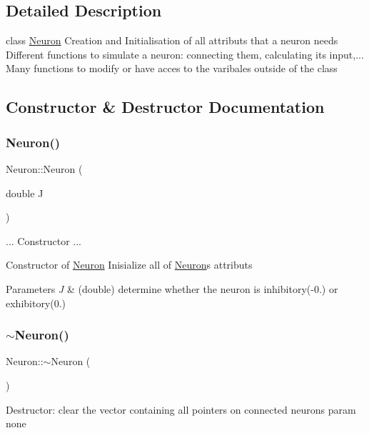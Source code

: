 \subsection{Detailed Description}
class \hyperlink{class_neuron}{Neuron} Creation and Initialisation of all attributs that a neuron needs Different functions to simulate a neuron\+: connecting them, calculating its input,... Many functions to modify or have acces to the varibales outside of the class 

\subsection{Constructor \& Destructor Documentation}
\mbox{\label{class_neuron_abefafe25b0ffd7144510bd26d193fe3b}} 
\subsubsection{\texorpdfstring{Neuron()}{Neuron()}}
{\footnotesize\ttfamily Neuron\+::\+Neuron (\begin{DoxyParamCaption}\item[{double}]{J }\end{DoxyParamCaption})}

... Constructor ...

Constructor of \hyperlink{class_neuron}{Neuron} Inisialize all of \hyperlink{class_neuron}{Neuron}\textquotesingle{}s attributs 
\begin{DoxyParams}{Parameters}
{\em J} & (double) determine whether the neuron is inhibitory(-\/0.) or exhibitory(0.) \\
\hline
\end{DoxyParams}
\mbox{\label{class_neuron_a94a250ce7e167760e593979b899745b1}} 
\subsubsection{\texorpdfstring{$\sim$\+Neuron()}{~Neuron()}}
{\footnotesize\ttfamily Neuron\+::$\sim$\+Neuron (\begin{DoxyParamCaption}{ }\end{DoxyParamCaption})}

Destructor\+: clear the vector containing all pointers on connected neurons param none 

